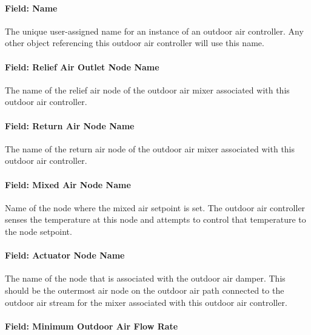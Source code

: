 \paragraph{Field: Name}\label{field-name-1-006}

The unique user-assigned name for an instance of an outdoor air controller. Any other object referencing this outdoor air controller will use this name.

\paragraph{Field: Relief Air Outlet Node Name}\label{field-relief-air-outlet-node-name}

The name of the relief air node of the outdoor air mixer associated with this outdoor air controller.

\paragraph{Field: Return Air Node Name}\label{field-return-air-node-name}

The name of the return air node of the outdoor air mixer associated with this outdoor air controller.

\paragraph{Field: Mixed Air Node Name}\label{field-mixed-air-node-name-000}

Name of the node where the mixed air setpoint is set. The outdoor air controller senses the temperature at this node and attempts to control that temperature to the node setpoint.

\paragraph{Field: Actuator Node Name}\label{field-actuator-node-name-1}

The name of the node that is associated with the outdoor air damper. This should be the outermost air node on the outdoor air path connected to the outdoor air stream for the mixer associated with this outdoor air controller.

\paragraph{Field: Minimum Outdoor Air Flow Rate}\label{field-minimum-outdoor-air-flow-rate}

